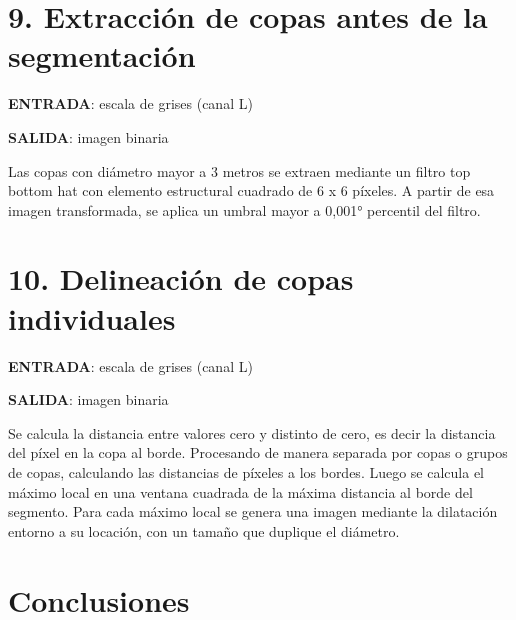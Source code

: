 \documentclass[11pt]{article}
\begin{document}
    \hypertarget{extracciuxf3n-de-copas-antes-de-la-segmentaciuxf3n}{%
\section{9. Extracción de copas antes de la
segmentación}\label{extracciuxf3n-de-copas-antes-de-la-segmentaciuxf3n}}

\textbf{ENTRADA}: escala de grises (canal L)

\textbf{SALIDA}: imagen binaria

Las copas con diámetro mayor a 3 metros se extraen mediante un filtro
top bottom hat con elemento estructural cuadrado de 6 x 6 píxeles. A
partir de esa imagen transformada, se aplica un umbral mayor a 0,001°
percentil del filtro.

    \hypertarget{delineaciuxf3n-de-copas-individuales}{%
\section{10. Delineación de copas
individuales}\label{delineaciuxf3n-de-copas-individuales}}

\textbf{ENTRADA}: escala de grises (canal L)

\textbf{SALIDA}: imagen binaria

Se calcula la distancia entre valores cero y distinto de cero, es decir
la distancia del píxel en la copa al borde. Procesando de manera
separada por copas o grupos de copas, calculando las distancias de
píxeles a los bordes. Luego se calcula el máximo local en una ventana
cuadrada de la máxima distancia al borde del segmento. Para cada máximo
local se genera una imagen mediante la dilatación entorno a su locación,
con un tamaño que duplique el diámetro.

    \hypertarget{conclusiones}{%
\section{Conclusiones}\label{conclusiones}}

    


    
    
    
\end{document}
